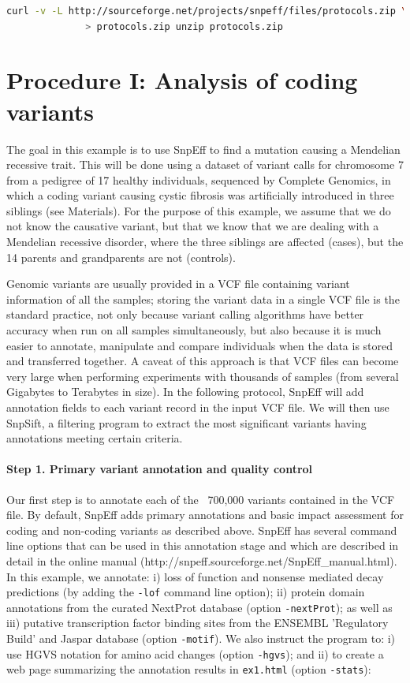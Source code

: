 \begin{lstlisting}[language=bash]
curl -v -L http://sourceforge.net/projects/snpeff/files/protocols.zip \
              > protocols.zip unzip protocols.zip
\end{lstlisting}

\section{Procedure I: Analysis of coding variants}

The goal in this example is to use SnpEff to find a mutation causing a Mendelian recessive trait. This will be done using a dataset of variant calls for chromosome 7 from a pedigree of 17 healthy individuals, sequenced by Complete Genomics, in which a coding variant causing cystic fibrosis was artificially introduced in three siblings (see Materials). For the purpose of this example, we assume that we do not know the causative variant, but that we know that we are dealing with a Mendelian recessive disorder, where the three siblings are affected (cases), but the 14 parents and grandparents are not (controls).

Genomic variants are usually provided in a VCF file containing variant information of all the samples; storing the variant data in a single VCF file is the standard practice, not only because variant calling algorithms have better accuracy when run on all samples simultaneously, but also because it is much easier to annotate, manipulate and compare individuals when the data is stored and transferred together. A caveat of this approach is that VCF files can become very large when performing experiments with thousands of samples (from several Gigabytes to Terabytes in size). In the following protocol, SnpEff will add annotation fields to each variant record in the input VCF file. We will then use SnpSift, a filtering program to extract the most significant variants having annotations meeting certain criteria.

\paragraph{Step 1. Primary variant annotation and quality control} Our first step is to annotate each of the ~700,000 variants contained in the VCF file. By default, SnpEff adds primary annotations and basic impact assessment for coding and non-coding variants as described above. SnpEff has several command line options that can be used in this annotation stage and which are described in detail in the online manual (http://snpeff.sourceforge.net/SnpEff\_manual.html). In this example, we annotate: i) loss of function and nonsense mediated decay predictions (by adding the \texttt{-lof} command line option); ii) protein domain annotations from the curated NextProt database (option \texttt{-nextProt}); as well as iii)
putative transcription factor binding sites from the ENSEMBL 'Regulatory Build' and Jaspar database (option \texttt{-motif}). We also instruct the program to: i) use HGVS notation for amino acid changes (option \texttt{-hgvs}); and ii) to create a web page summarizing the annotation results in \texttt{ex1.html} (option \texttt{-stats}):

